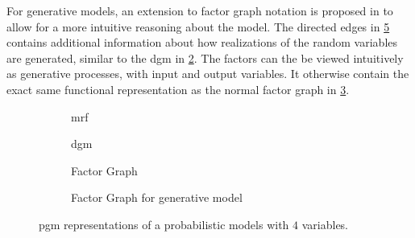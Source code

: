 For generative models, an extension to factor graph notation is proposed in \cite{dietz} to allow for a more intuitive reasoning about the model. The directed edges in \cref{fig:factor_directed} contains additional information about how realizations of the random variables are generated, similar to the \acrshort{dgm} in \cref{fig:dgm}. The factors can the be viewed intuitively as generative processes, with input and output variables. It otherwise contain the exact same functional representation as the normal factor graph in \cref{fig:factor}. 

\begin{figure}[h]
\centering
\begin{subfigure}{0.49\textwidth}
\centering
{}
\caption{\acrfull{mrf}}
\label{fig:mrf}
\end{subfigure}
\begin{subfigure}{0.49\textwidth}
\centering
{}
\caption{\acrfull{dgm}}
\label{fig:dgm}
\end{subfigure}
\begin{subfigure}{0.49\textwidth}
\centering
{}
\caption{Factor Graph}
\label{fig:factor}
\end{subfigure}
\begin{subfigure}{0.49\textwidth}
\centering
{}
\caption{Factor Graph for generative model}
\label{fig:factor_directed}
\end{subfigure}

\caption{\acrshort{pgm} representations of a probabilistic models with $4$ variables.}
\end{figure}
